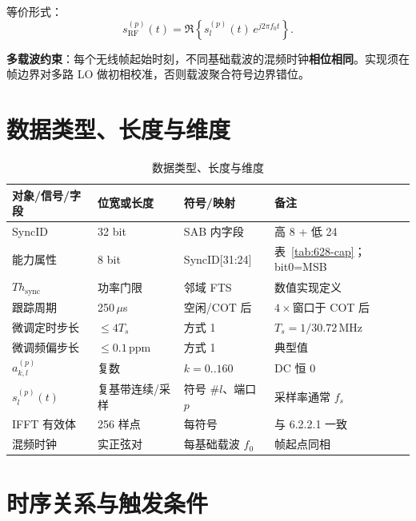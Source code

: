 \documentclass[11pt,a4paper]{ctexart}
\begin{document}
等价形式：
\begin{equation}
s_{\mathrm{RF}}^{(p)}(t)=\Re\left\{s_l^{(p)}(t)\,e^{j2\pi f_0 t}\right\}.
\label{eq:6210}
\end{equation}

\textbf{多载波约束}：每个无线帧起始时刻，不同基础载波的混频时钟\textbf{相位相同}。实现须在帧边界对多路 LO 做初相校准，否则载波聚合符号边界错位。

\section{数据类型、长度与维度}

\begin{longtable}{L{3.5cm}L{3.5cm}L{3.5cm}L{3.5cm}}
\caption{数据类型、长度与维度\label{tab:62710-dtype}} \\
\toprule
\textbf{对象/信号/字段} & \textbf{位宽或长度} & \textbf{符号/映射} & \textbf{备注} \\
\midrule
SyncID & 32 bit & SAB 内字段 & 高 8 + 低 24 \\
能力属性 & 8 bit & SyncID[31:24] & 表~\ref{tab:628-cap}；bit0=MSB \\
$Th_{\mathrm{sync}}$ & 功率门限 & 邻域 FTS & 数值实现定义 \\
跟踪周期 & 250\,$\mu$s & 空闲/COT 后 & $4\times$窗口于 COT 后 \\
微调定时步长 & $\le 4T_s$ & 方式 1 & $T_s{=}1/30.72$\,MHz \\
微调频偏步长 & $\le 0.1$\,ppm & 方式 1 & 典型值 \\
$a_{k,l}^{(p)}$ & 复数 & $k{=}0..160$ & DC 恒 0 \\
$s_l^{(p)}(t)$ & 复基带连续/采样 & 符号 \#$l$、端口 $p$ & 采样率通常 $f_s$ \\
IFFT 有效体 & 256 样点 & 每符号 & 与 6.2.2.1 一致 \\
混频时钟 & 实正弦对 & 每基础载波 $f_0$ & 帧起点同相 \\
\bottomrule
\end{longtable}

\section{时序关系与触发条件}
\end{document}
